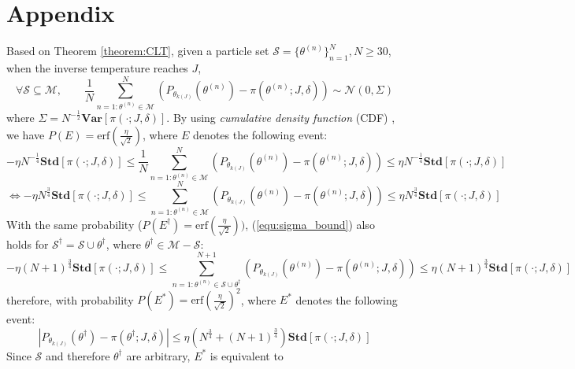 \documentclass{article} %
\begin{document}
\section*{Appendix}
Based on Theorem \ref{theorem:CLT},  given a particle set $\mathcal{S}=\{\theta^{(n)}\}_{n=1}^N, N\geq 30$, when the inverse temperature 
reaches $J$, 
\begin{equation}
	\forall \mathcal{S}\subseteq \mathcal{M}, \quad\quad \frac{1}{N} \sum_{n=1:\theta^{(n)}\in\mathcal{M}}^N(P_{\theta_{k(J)}}(\theta^{(n)})-\pi(\theta^{(n)};J,\delta)) \sim \mathcal{N}(0, \Sigma)
\end{equation}
where $\Sigma= N^{-\frac{1}{2}}\mathbf{Var}[\pi(\cdot;J,\delta)]$. By using \emph{cumulative density function} (CDF) , we have $P(E)=\text{erf}\left(\frac{\eta}{\sqrt{2}}\right)$, where $E$ denotes the following event:
\begin{equation}
	-\eta N^{-\frac{1}{4}}\mathbf{Std}[\pi(\cdot;J,\delta)]\leq \frac{1}{N}\sum_{n=1:\theta^{(n)}\in\mathcal{M}}^N (P_{\theta_{k(J)}}(\theta^{(n)})-\pi(\theta^{(n)};J,\delta))\leq \eta N^{-\frac{1}{4}}\mathbf{Std}[\pi(\cdot;J,\delta)] 
\end{equation}
\begin{equation}
	\Longleftrightarrow  -\eta N^{\frac{3}{4}}\mathbf{Std}[\pi(\cdot;J,\delta)]\leq \sum_{n=1:\theta^{(n)}\in\mathcal{M}}^N (P_{\theta_{k(J)}}(\theta^{(n)})-\pi(\theta^{(n)};J,\delta))\leq \eta N^{\frac{3}{4}}\mathbf{Std}[\pi(\cdot;J,\delta)] 
\label{equ:sigma_bound}
\end{equation}
With the same probability ($P(E^\dagger)=\text{erf}\left(\frac{\eta}{\sqrt{2}}\right))$, (\ref{equ:sigma_bound}) also holds for $\mathcal{S}^{\dagger}=\mathcal{S}\cup \theta^\dagger$, where $\theta^\dagger \in \mathcal{M}-\mathcal{S}$:
\begin{equation}
	-\eta (N+1)^{\frac{3}{4}}\mathbf{Std}[\pi(\cdot;J,\delta)]\leq \sum_{n=1:\theta^{(n)}\in\mathcal{S}\cup \theta^\dagger}^{N+1} (P_{\theta_{k(J)}}(\theta^{(n)})-\pi(\theta^{(n)};J,\delta))\leq \eta (N+1)^{\frac{3}{4}}\mathbf{Std}[\pi(\cdot;J,\delta)] 
\end{equation}
therefore, with probability $P(E^*)=\text{erf}(\frac{\eta}{\sqrt{2}})^2$, where $E^*$ denotes the following event: 
\begin{equation}
	\left|P_{\theta_{k(J)}}(\theta^\dagger)-\pi(\theta^\dagger;J,\delta)\right|\leq \eta (N^{\frac{3}{4}}+(N+1)^{\frac{3}{4}})\mathbf{Std}[\pi(\cdot;J,\delta)]
\end{equation}
Since $\mathcal{S}$ and therefore $\theta^{\dagger}$ are arbitrary, $E^*$ is equivalent to
\end{document}
